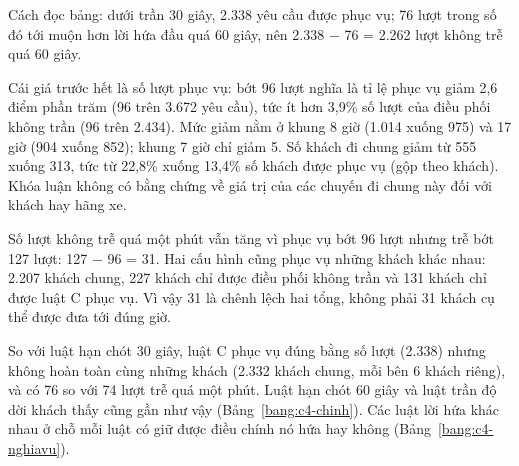 Cách đọc bảng: dưới trần 30 giây, 2.338 yêu cầu được phục vụ; 76 lượt trong số đó tới muộn hơn lời hứa đầu quá 60
giây, nên 2.338 $-$ 76 = 2.262 lượt không trễ quá 60 giây.

Cái giá trước hết là số lượt phục vụ: bớt 96 lượt nghĩa là tỉ lệ phục vụ giảm 2,6 điểm phần trăm (96 trên 3.672 yêu
cầu), tức ít hơn 3,9\% số lượt của điều phối không trần (96 trên 2.434). Mức giảm nằm ở khung 8 giờ (1.014 xuống 975)
và 17 giờ (904 xuống 852); khung 7 giờ chỉ giảm 5. Số khách đi chung giảm từ 555 xuống 313, tức từ 22,8\% xuống 13,4\%
số khách được phục vụ (gộp theo khách). Khóa luận không có bằng chứng về giá trị của các chuyến đi chung này đối với
khách hay hãng xe.

Số lượt không trễ quá một phút vẫn tăng vì phục vụ bớt 96 lượt nhưng trễ bớt 127 lượt: 127 $-$ 96 = 31. Hai cấu hình
cũng phục vụ những khách khác nhau: 2.207 khách chung, 227 khách chỉ được điều phối không trần và 131 khách chỉ được
luật C phục vụ. Vì vậy 31 là chênh lệch hai tổng, không phải 31 khách cụ thể được đưa tới đúng giờ.

So với luật hạn chót 30 giây, luật C phục vụ đúng bằng số lượt (2.338) nhưng không hoàn toàn cùng những khách (2.332
khách chung, mỗi bên 6 khách riêng), và có 76 so với 74 lượt trễ quá một phút. Luật hạn chót 60 giây và luật trần độ
dời khách thấy cũng gần như vậy (Bảng~\ref{bang:c4-chinh}). Các luật lời hứa khác nhau ở chỗ mỗi luật có giữ được điều
chính nó hứa hay không (Bảng~\ref{bang:c4-nghiavu}).

